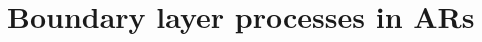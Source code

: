 \documentclass[letterpaper,12pt]{article}
\begin{document}





\section{Boundary layer processes in ARs}\label{sec:BLAR}

\end{document}
